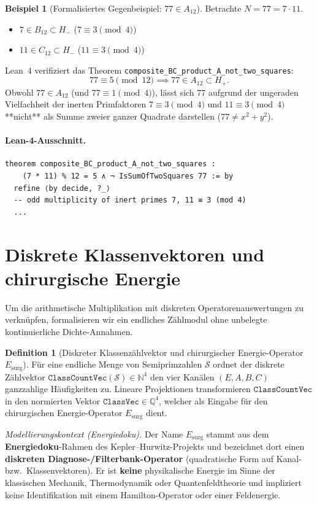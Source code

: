 \documentclass[11pt,a4paper]{article}
\theoremstyle{definition}
\newtheorem{definition}[theorem]{Definition}
\newtheorem{example}[theorem]{Beispiel}
\begin{document}
	\begin{example}[Formalisiertes Gegenbeispiel: $77 \in A_{12}$]
		Betrachte $N = 77 = 7 \cdot 11$.
		\begin{itemize}
			\item $7 \in B_{12} \subset H_-$ ($7 \equiv 3 \pmod 4$)
			\item $11 \in C_{12} \subset H_-$ ($11 \equiv 3 \pmod 4$)
		\end{itemize}
		Lean~4 verifiziert das Theorem \texttt{composite\_BC\_product\_A\_not\_two\_squares}:
		\[
		77 \equiv 5 \pmod{12} \implies 77 \in A_{12} \subset H_+.
		\]
		Obwohl $77 \in A_{12}$ (und $77 \equiv 1 \pmod 4$), lässt sich $77$ aufgrund der ungeraden Vielfachheit der inerten Primfaktoren $7 \equiv 3 \pmod 4$ und $11 \equiv 3 \pmod 4$ **nicht** als Summe zweier ganzer Quadrate darstellen ($77 \neq x^2 + y^2$).
	\end{example}

	\paragraph{Lean-4-Ausschnitt.}
	\begin{lstlisting}[caption={Ausschnitt: BC-Produkt in $A_{12}$ ohne Zwei-Quadrate-Darstellung}]
theorem composite_BC_product_A_not_two_squares :
    (7 * 11) % 12 = 5 ∧ ¬ IsSumOfTwoSquares 77 := by
  refine ⟨by decide, ?_⟩
  -- odd multiplicity of inert primes 7, 11 ≡ 3 (mod 4)
  ...
	\end{lstlisting}
	
	\section{Diskrete Klassenvektoren und chirurgische Energie}
	
	Um die arithmetische Multiplikation mit diskreten Operatorenauswertungen zu verknüpfen, formalisieren wir ein endliches Zählmodul ohne unbelegte kontinuierliche Dichte-Annahmen.
	
	\begin{definition}[Diskreter Klassenzählvektor und chirurgischer Energie-Operator $E_{\mathrm{surg}}$]
		\label{def:classvec-esurg}
		Für eine endliche Menge von Semiprimzahlen $\mathcal{S}$ ordnet der diskrete Zählvektor $\mathtt{ClassCountVec}(\mathcal{S}) \in \mathbb{N}^4$ den vier Kanälen $(E, A, B, C)$ ganzzahlige Häufigkeiten zu. Lineare Projektionen transformieren $\mathtt{ClassCountVec}$ in den normierten Vektor $\mathtt{ClassVec} \in \mathbb{Q}^4$, welcher als Eingabe für den chirurgischen Energie-Operator $E_{\mathrm{surg}}$ dient.

		\textit{Modellierungskontext (Energiedoku).}
		Der Name $E_{\mathrm{surg}}$ stammt aus dem \textbf{Energiedoku}-Rahmen des Kepler--Hurwitz-Projekts und bezeichnet dort einen
		\textbf{diskreten Diagnose-/Filterbank-Operator} (quadratische Form auf Kanal- bzw.\ Klassenvektoren).
		Er ist \textbf{keine} physikalische Energie im Sinne der klassischen Mechanik, Thermodynamik oder Quantenfeldtheorie und impliziert keine Identifikation mit einem Hamilton-Operator oder einer Feldenergie.
	\end{definition}
	
\end{document}
